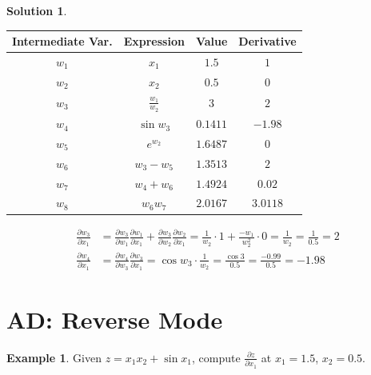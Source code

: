 \documentclass[10pt]{extarticle}
\newcommand{\ds}{\displaystyle}
\theoremstyle{definition}
\newtheorem*{ex}{Example}
\newtheorem*{sol}{Solution}
\begin{document}
\begin{sol}
  \leavevmode
  \begin{center}
    \begin{tabular}{cccc}
      \toprule
      Intermediate Var. & Expression & Value & Derivative \\
      \midrule
      $w_1$ & $x_1$ & $1.5$ & $1$ \\
      $w_2$ & $x_2$ & $0.5$ & $0$ \\
      $w_3$ & $\frac{w_1}{w_2}$ & $3$ & $2$ \\
      $w_4$ & $\sin w_3$ & $0.1411$ & $-1.98$ \\
      $w_5$ & $e^{w_2}$ & $1.6487$ & $0$ \\
      $w_6$ & $w_3 - w_5$ & $1.3513$ & $2$ \\
      $w_7$ & $w_4 + w_6$ & $1.4924$ & $0.02$ \\
      $w_8$ & $w_6 w_7$ & $2.0167$ & $3.0118$ \\
      \bottomrule
    \end{tabular}
  \end{center}
  \begin{align*}
    \frac{\partial w_3}{\partial x_1} &= \frac{\partial w_3}{\partial w_1}\frac{\partial w_1}{\partial x_1} + \frac{\partial w_3}{\partial w_2}\frac{\partial w_2}{\partial x_1} = \frac{1}{w_2}\cdot 1 + \frac{-w_1}{w_2^2}\cdot 0 = \frac{1}{w_2} = \frac{1}{0.5} = 2 \\
    \frac{\partial w_4}{\partial x_1} &= \frac{\partial w_4}{\partial w_3}\frac{\partial w_3}{\partial x_1} = \cos w_3\cdot\frac{1}{w_2} = \frac{\cos 3}{0.5} = \frac{-0.99}{0.5} = -1.98
  \end{align*}
\end{sol}
\newpage

\section*{AD: Reverse Mode}

\begin{ex}
  Given $\ds z = x_1 x_2 + \sin x_1$, compute $\ds\frac{\partial z}{\partial x_1}$ at $x_1 = 1.5$, $x_2 = 0.5$.
\end{ex}
\end{document}
